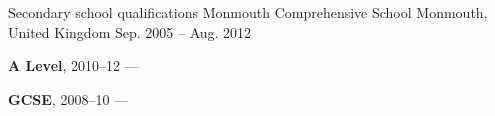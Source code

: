 \begin{cventries}
    \cventry
        {Secondary school qualifications}
        {Monmouth Comprehensive School}
        {Monmouth, United Kingdom}
        {Sep. 2005 -- Aug. 2012}
        {
        \begin{cvitems}
            \item {\textbf{A Level}, 2010--12 --- }
            \vpaddingEdu
            \item {\textbf{GCSE}, 2008--10 --- }
        \end{cvitems}
        }
\end{cventries}
